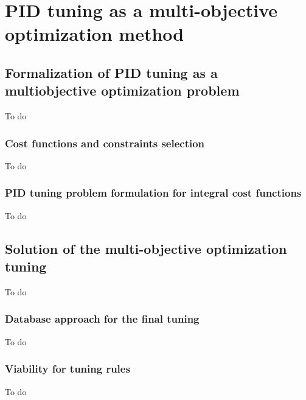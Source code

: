 \chapter{PID tuning as a multi-objective optimization method}
\label{chap:PIDMOOP}
\section{Formalization of PID tuning as a multiobjective optimization problem}
\label{sec:FormPIDMOOP}
To do
\subsection{Cost functions and constraints selection}
\label{sec:CostFunSelec}
To do
\subsection{PID tuning problem formulation for integral cost functions}
\label{sec:CostProbPID}
To do
\section{Solution of the multi-objective optimization tuning}
\label{sec:SolMOOP}
To do
\subsection{Database approach for the final tuning}
\label{sec:DatabaseMOOP}
To do
%
\subsection{Viability for tuning rules}
\label{sec:TuningRulesMOOP}
To do